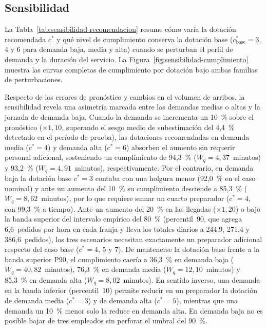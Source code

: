 \subsection{Sensibilidad}
\label{sec:resultados-sensibilidad}

La Tabla~\ref{tab:sensibilidad-recomendacion} resume cómo varía la dotación recomendada $c^*$ y qué nivel de cumplimiento conserva la dotación base ($c^*_{\mathrm{base}} = 3$, 4 y 6 para demanda baja, media y alta) cuando se perturban el perfil de demanda y la duración del servicio.
La Figura~\ref{fig:sensibilidad-cumplimiento} muestra las curvas completas de cumplimiento por dotación bajo ambas familias de perturbaciones.

\begin{table}[htbp]
  \centering
  \caption{Sensibilidad de la dotación recomendada $c^*$ y del cumplimiento de la dotación base ($c^*_{\mathrm{base}} = 3$, 4, 6) ante variaciones de la demanda pronosticada y de los tiempos de preparación.}
  \label{tab:sensibilidad-recomendacion}
  
\end{table}

Respecto de los errores de pronóstico y cambios en el volumen de arribos, la sensibilidad revela una asimetría marcada entre las demandas medias o altas y la jornada de demanda baja.
Cuando la demanda se incrementa un 10~\% sobre el pronóstico ($\times 1{,}10$, superando el sesgo medio de subestimación del 4,4~\% detectado en el período de prueba), las dotaciones recomendadas en demanda media ($c^* = 4$) y demanda alta ($c^* = 6$) absorben el aumento sin requerir personal adicional, sosteniendo un cumplimiento de 94,3~\% ($W_q = 4{,}37$~minutos) y 93,2~\% ($W_q = 4{,}91$~minutos), respectivamente.
Por el contrario, en demanda baja la dotación base $c^* = 3$ contaba con una holgura menor (92,0~\% en el caso nominal) y ante un aumento del 10~\% su cumplimiento desciende a 85,3~\% ($W_q = 8{,}62$~minutos), por lo que requiere sumar un cuarto preparador ($c^* = 4$, con 99,3~\% a tiempo).
Ante un aumento del 20~\% en las llegadas ($\times 1{,}20$) o bajo la banda superior del intervalo empírico del 80~\% (percentil~90, que agrega 6,6~pedidos por hora en cada franja y lleva los totales diarios a 244,9, 271,4 y 386,6~pedidos), los tres escenarios necesitan exactamente un preparador adicional respecto del caso base ($c^* = 4$, 5 y 7).
De mantenerse la dotación base frente a la banda superior P90, el cumplimiento caería a 36,3~\% en demanda baja ($W_q = 40{,}82$~minutos), 76,3~\% en demanda media ($W_q = 12{,}10$~minutos) y 85,3~\% en demanda alta ($W_q = 8{,}02$~minutos).
En sentido inverso, una demanda en la banda inferior (percentil~10) permite reducir en un preparador la dotación de demanda media ($c^* = 3$) y de demanda alta ($c^* = 5$), mientras que una demanda un 10~\% menor solo la reduce en demanda alta.
En demanda baja no es posible bajar de tres empleados sin perforar el umbral del 90~\%.

